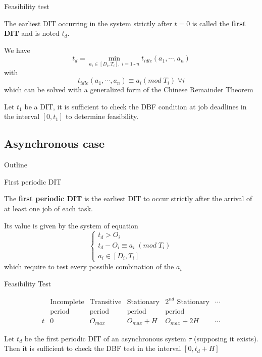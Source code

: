 \documentclass{beamer}
\begin{document}
\begin{frame}{Feasibility test}
    \begin{definition}
    The earliest DIT occurring in the system strictly after $t=0$ is called the \textbf{first DIT} and is noted $t_d$.
    \end{definition}

    We have
    $$t_d = \operatorname*{min}_{a_i \in [D_i, T_i], \; i = 1 \cdots n} t_{idle} (a_1, \cdots, a_n)$$
    with
    $$ t_{idle}(a_1, \cdots, a_n) \equiv a_i (mod \; T_i) \; \forall i $$
    which can be solved with a generalized form of the Chinese Remainder Theorem

    \begin{theorem}
    Let $t_1$ be a DIT, it is sufficient to check the DBF condition at job deadlines in the interval $[0, t_1]$ to determine feasibility.
    \end{theorem}
\end{frame}

\subsection{Asynchronous case}

\begin{frame}{Outline}
\end{frame}

\begin{frame}{First periodic DIT}
    \begin{definition}
    The \textbf{first periodic DIT} is the earliest DIT to occur strictly after the arrival of at least one job of each task.
    \end{definition}

    Its value is given by the system of equation
    $$
      \left\{
        \begin{array}{l}
        t_d > O_i \\
        t_d - O_i \equiv a_i \; (mod \; T_i) \\
        a_i \in [D_i, T_i]
      \end{array}
      \right.
    $$
    which require to test every possible combination of the $a_i$
\end{frame}

\begin{frame}{Feasibility Test}

    $$
    \begin{array}{r|c|c|c|c|l}
       & \text{Incomplete} & \text{Transitive} & \text{Stationary} & \text{$2^{nd}$ Stationary} & \cdots \\
       & \text{period} & \text{period} & \text{period} & \text{period} & \\
      \hline
      t & 0 & O_{max} & O_{max} + H & O_{max} + 2H & \cdots
    \end{array}
    $$

    \begin{theorem}
    Let $t_d$ be the first periodic DIT of an asynchronous system $\tau$ (supposing it exists). Then it is sufficient to check the DBF test in the interval $[0, t_d + H]$
    \end{theorem}
\end{frame}
\end{document}
